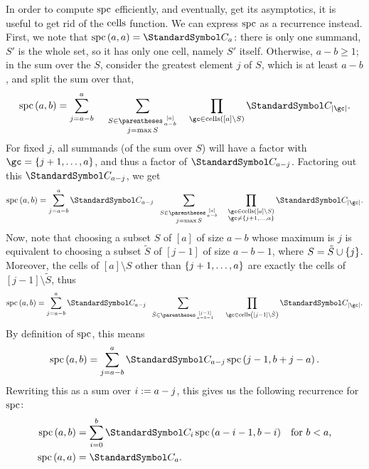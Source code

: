 In order to compute $\operatorname{spc}$ efficiently, and eventually, get its asymptotics, it is useful to get rid
of the $\operatorname{cells}$ function. We can express $\operatorname{spc}$ as a recurrence instead.
First, we note that $\spc\of{a,a} = \CatalanNumber a$: there is only one summand, $S'$ is the whole set, so
it has only one cell, namely $S'$ itself.
Otherwise, $a-b\geq 1$; in the sum over the $S$, consider the greatest element $j$ of $S$, which is at least
$a-b$, and split the sum over that,
\[\spc\of{a,b} = \sum{j=a-b}[a]\quad\;
\sum{\substack{S\in\binom{[a]}{a-b} \\ j=\max S}} \quad
\prod{\gc\in\cells\of{[a] \setminus S}}\CatalanNumber {\Cardinality \gc}\text.
\]
For fixed $j$, all summands (of the sum over $S$) will have a factor
with $\gc=\set{j+1,\dotsc,a}$, and thus a factor of
$\CatalanNumber {a-j}$. Factoring out this $\CatalanNumber {a-j}$, we get
\[\spc\of{a, b} = \sum{j=a-b}[a]
\CatalanNumber {a-j} \;\;
\sum{\substack{S\in\binom{[a]}{a-b} \\ j=\max S}} \quad
\prod{\substack{\gc\in\cells\of{[a] \setminus S} \\ \gc\neq\set{j+1,\dotsc,a}}}
    \CatalanNumber {\Cardinality \gc}\text.
\]
Now, note that choosing a subset $S$ of $[a]$ of size $a-b$ whose maximum is $j$ is equivalent to choosing
a subset $\tilde{S}$ of $[j-1]$ of size $a-b - 1$, where $S=\tilde{S}\cup\left\lbrace j\right\rbrace$.
Moreover, the cells of $[a]\setminus S$ other
than $\left\lbrace j+1,\dotsc,a\right\rbrace$ are exactly the cells of $[j-1]\setminus \tilde{S}$, thus
\[\spc\of{a,b} = \sum{j=a-b}[a]
\CatalanNumber {a-j} \;\;
\sum{\tilde{S}\in\binom{[j-1]}{a-b - 1}} \quad\;
\prod{\gc\in\cells\of{[j-1]\setminus \tilde{S}}}
    \CatalanNumber {\Cardinality \gc}\text.
\]
By definition of $\operatorname{spc}$, this means
\[\spc\of{a,b} = \sum{j=a-b}[a]
\CatalanNumber {a-j}
\spc\of{j-1,b+j-a}\text.
\]
Rewriting this as a sum over $i:= a-j$, this gives us the following recurrence for $\operatorname{spc}$:
\begin{align}\spc\of{a,b} &= \sum{i=0}[b]
\CatalanNumber {i}
\spc\of{a-i-1,b-i} &\text{for $b<a$,} \label{spcRecurrence1}\\
\spc\of{a,a} &= \CatalanNumber a \label{spckk}\text.
\end{align}
